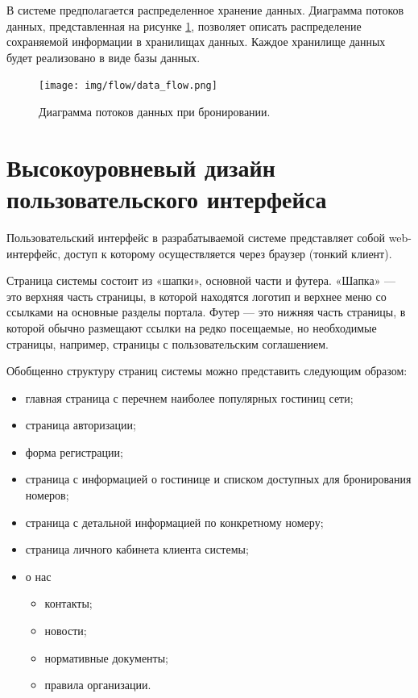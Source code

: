 \pagebreak

В системе предполагается распределенное хранение данных. Диаграмма потоков данных, представленная на рисунке \ref{fig:data_flow}, позволяет описать распределение сохраняемой информации в хранилищах данных. Каждое хранилище данных будет реализовано в виде базы данных.

\begin{figure}[h!]
	\begin{center}
		{\texttt{[image: img/flow/data\_flow.png]}}
		\caption{Диаграмма потоков данных при бронировании.}
		\label{fig:data_flow}
	\end{center}
\end{figure} 

\pagebreak

\section*{Высокоуровневый дизайн пользовательского интерфейса}
Пользовательский интерфейс в разрабатываемой системе представляет собой web-интерфейс, доступ к которому осуществляется через браузер (тонкий клиент).

Страница системы состоит из «шапки», основной части и футера.  «Шапка» —  это  верхняя  часть  страницы,  в  которой находятся логотип и верхнее меню со ссылками на основные разделы портала. Футер — это нижняя часть страницы, в которой обычно размещают ссылки  на  редко  посещаемые,  но  необходимые  страницы,  например, страницы с пользовательским соглашением.

Обобщенно структуру страниц системы можно представить следующим образом:
\begin{itemize}
	\item главная страница с перечнем наиболее популярных гостиниц сети;
	
	\item страница авторизации;
		
	\item форма регистрации;
	
	\item страница с информацией о гостинице и списком доступных для бронирования номеров;
	
	\item страница с детальной информацией по конкретному номеру;
	
	\item страница личного кабинета клиента системы;
	
	\item о нас
	\begin{itemize}
		\item контакты;
		
		\item новости;
		
		\item нормативные документы;
		
		\item правила организации.
	\end{itemize}
\end{itemize}

